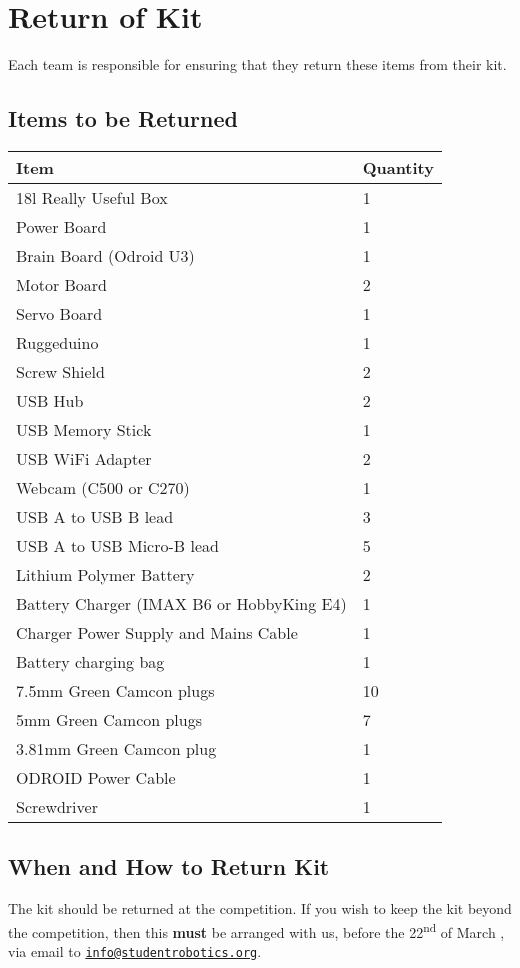 \section {Return of Kit}
\label{sec:kit-return}

Each team is responsible for ensuring that they return these items from their kit.

\subsection {Items to be Returned}

\begin{tabular}{ll}
 \toprule
 \textbf{Item} & \textbf{Quantity} \\
 \midrule
 18l Really Useful Box & 1 \\

 Power Board & 1 \\
 Brain Board (Odroid U3) & 1 \\
 Motor Board & 2 \\
 Servo Board & 1 \\
 Ruggeduino & 1 \\
 Screw Shield & 2 \\

 USB Hub & 2 \\
 USB Memory Stick & 1 \\
 USB WiFi Adapter & 2 \\
 Webcam (C500 or C270) & 1 \\
 USB A to USB B lead & 3 \\
 USB A to USB Micro-B lead & 5 \\

 Lithium Polymer Battery & 2 \\
 Battery Charger (IMAX B6 or HobbyKing E4) & 1 \\
 Charger Power Supply and Mains Cable & 1 \\
 Battery charging bag & 1 \\

 7.5mm Green Camcon plugs & 10 \\
 5mm Green Camcon plugs & 7 \\
 3.81mm Green Camcon plug & 1 \\
 ODROID Power Cable & 1 \\
 Screwdriver & 1 \\
 \bottomrule
\end{tabular}

\subsection {When and How to Return Kit}

The kit should be returned at the competition.
If you wish to keep the kit beyond the competition, then this \textbf{must} be arranged with us,
 before the 22\textsuperscript{nd} of March \sryear, via email to \href{mailto:teams@studentrobotics.org}{\nolinkurl{info@studentrobotics.org}}.
